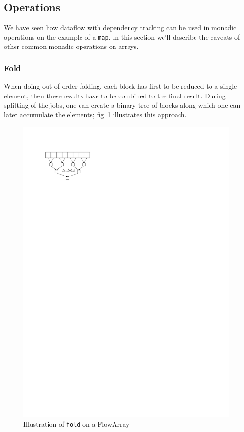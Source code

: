\documentclass[runningheads,a4paper,fleqn]{llncs}
\begin{document}
\subsection{Operations}
We have seen how dataflow with dependency tracking can be used in
monadic operations on the example of a \texttt{map}. In this section
we'll describe the caveats of other common monadic operations on
arrays.

\subsubsection{Fold}
When doing out of order folding, each block has first to be reduced to
a single element, then these results have to be combined to the final
result. During splitting of the jobs, one can create a binary tree of
blocks along which one can later accumulate the elements;
fig~\ref{fig:fa-fold} illustrates this approach.

\begin{figure}
  \centering
  \includegraphics{fa-fold}
  \caption{Illustration of \texttt{fold} on a FlowArray}
  \label{fig:fa-fold}
\end{figure}
\end{document}
